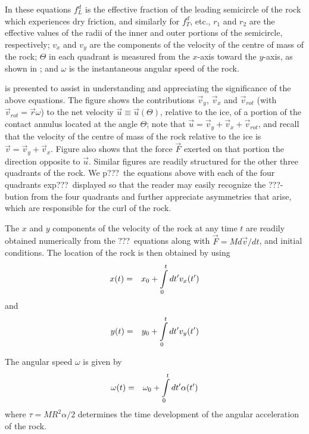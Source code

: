 {\begin{flowtext}{2}

In these equations $f_L^d$ is the effective fraction of the leading semicircle
of the rock which experiences dry friction, and similarly for $f_T^d$, etc.,
$r_1$ and $r_2$ are the effective values of the radii of the inner and outer
portions of the semicircle, respectively; $v_x$ and $v_y$ are the components of
the velocity of the centre of mass of the rock; $\Theta$ in each quadrant is
measured from the $x$-axis toward the $y$-axis, as shown in ;
and $\omega$ is the instantaneous angular speed of the rock.

 is presented to assist in understanding and appreciating the
significance of the above equations. The figure shows the contributions
$\vec{v}_y$, $\vec{v}_x$ and $\vec{v}_{rot}$ (with $\vec{v}_{rot} =
\vec{r}\omega$) to the net velocity $\vec{u} \equiv \vec{u}(\Theta)$, relative
to the ice, of a portion of the contact annulus located at the angle $\Theta$;
note that $\vec{u} = \vec{v}_y + \vec{v}_x + \vec{v}_{rot}$, and recall that
the velocity of the centre of mass of the rock relative to the ice is $\vec{v}
= \vec{v}_y + \vec{v}_x$. Figure  also shows that the force
$\vec{F}$ exerted on that portion the direction opposite to $\vec{u}$. Similar
figures are readily structured for the other three quadrants of the rock. We
p???\ the equations above with each of the four quadrants exp???\ displayed so
that the reader may easily recognize the ???-bution from the four quadrants and
further appreciate asymmetries that arise, which are responsible for the curl
of the rock.

The $x$ and $y$ components of the velocity of the rock at any time $t$ are readily obtained
numerically from the ???\ equations along with $\vec{F} = M d\vec{v}/dt$, and
initial conditions. The location of the rock is then obtained by using
\begin{eqnarray}
x(t) &=& x_0 + \int\limits_0^t dt' v_x(t')
\end{eqnarray}
and
\begin{eqnarray}
y(t) &=& y_0 + \int\limits_0^t dt' v_y(t')
\end{eqnarray}

The angular speed $\omega$ is  given by
\begin{eqnarray}
\omega(t) &=& \omega_0 + \int\limits_0^t dt' \alpha(t')
\end{eqnarray}
where $\tau = MR^2\alpha/2$ determines the time development of the angular
acceleration of the rock.


\end{flowtext}}
